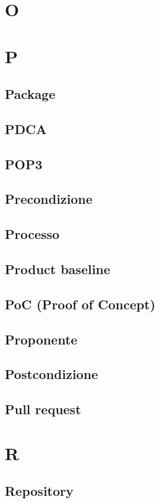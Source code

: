 \documentclass[12pt]{article}
\begin{document}
	\section{O}
	\clearpage
	\section{P}
		\subsection{Package}
		\subsection{PDCA} %
		\subsection{POP3}
		\subsection{Precondizione}
		\subsection{Processo}
		\subsection{Product baseline}
		\subsection{PoC (Proof of Concept)}
		\subsection{Proponente}
		\subsection{Postcondizione}
		\subsection{Pull request}
	\clearpage
	\section{R}
		\subsection{Repository}
\end{document}
